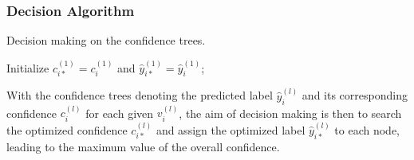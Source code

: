 \documentclass[letterpaper, 10 pt, conference]{ieeeconf}  %
\begin{document}

\subsubsection{Decision Algorithm}


\begin{algorithm}[tpb]\label{algorithm2}
\caption{Decision making on the confidence trees.}

\SetAlgoNoLine\LinesNumbered {}
\BlankLine
Initialize $c_{i*}^{(1)} = c_i^{(1)}$ and $\hat{y}_{i*}^{(1)} = \hat{y}_i^{(1)}$;\\
\end{algorithm}

With the confidence trees denoting the predicted label $\hat{y}_i^{(l)}$  and its corresponding confidence $c_i^{(l)}$ for each given $v_i^{(l)}$, the aim of decision making is then to search the optimized confidence $c_{i*}^{(l)}$ and assign the optimized label $\hat{y}_{i*}^{(l)}$ to each node, leading to the maximum value of the overall confidence.
\end{document}
